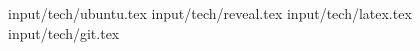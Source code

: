 
\newpage

\newpage
 {input/tech/ubuntu.tex}
\newpage
 {input/tech/reveal.tex}
\newpage
 {input/tech/latex.tex}
\newpage
 {input/tech/git.tex}




